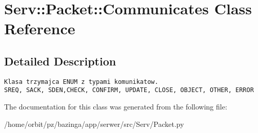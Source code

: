 \hypertarget{class_serv_1_1_packet_1_1_communicates}{
\section{Serv::Packet::Communicates Class Reference}
\label{class_serv_1_1_packet_1_1_communicates}
}


\subsection{Detailed Description}


\footnotesize\begin{verbatim}Klasa trzymajca ENUM z typami komunikatow.
SREQ, SACK, SDEN,CHECK, CONFIRM, UPDATE, CLOSE, OBJECT, OTHER, ERROR
\end{verbatim}
\normalsize
 

The documentation for this class was generated from the following file:\begin{CompactItemize}
\item 
/home/orbit/pz/bazinga/app/serwer/src/Serv/Packet.py\end{CompactItemize}
